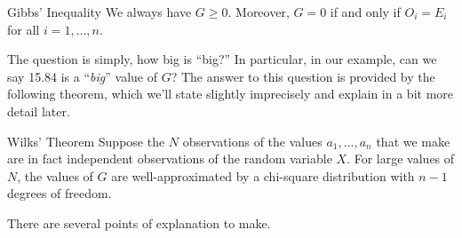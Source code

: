 \documentclass[letterpaper]{article}
\newcommand{\0}{\mathbf{0}}
\begin{document}
\bigskip 

\begin{theorem}{Gibbs' Inequality}{}
    We always have $G \geq 0$. Moreover, $G = 0$ if and only if $O_i = E_i$ for all $i = 1, \hdots, n$. 
\end{theorem}
The question is simply, how big is ``big?'' In particular, in our example, can we say 15.84 is a ``\emph{big}'' value of $G$? The answer to this question is provided by the following theorem, which we'll state slightly imprecisely and explain in a bit more detail later. 

\begin{theorem}{Wilks' Theorem}{}
    Suppose the $N$ observations of the values $a_1, \hdots, a_n$ that we make are in fact independent observations of the random variable $X$. For large values of $N$, the values of $G$ are well-approximated by a chi-square distribution with $n - 1$ degrees of freedom.
\end{theorem}
There are several points of explanation to make.
\end{document}
